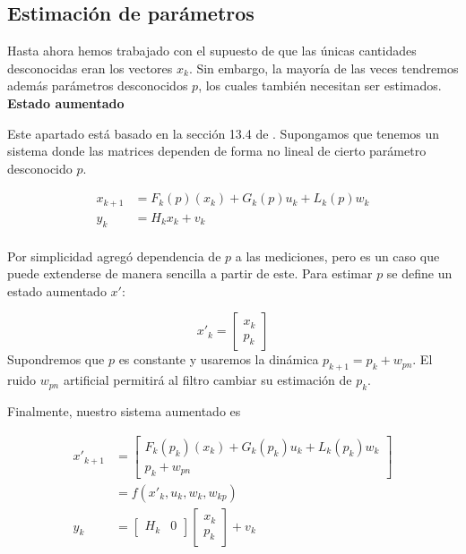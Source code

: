 \subsection{Estimación de
parámetros}\label{estimacion-de-parametros}

Hasta ahora hemos trabajado con el supuesto de que las únicas cantidades desconocidas eran los vectores \(x_k\). Sin embargo, la mayoría de las veces tendremos además parámetros desconocidos \(p\), los cuales también necesitan ser estimados. \\

\noindent\textbf{Estado aumentado}

Este apartado está basado en la sección 13.4 de \cite{Simon2006}. Supongamos que tenemos un sistema donde las matrices dependen de forma no lineal de cierto parámetro desconocido \(p\). 

\[
\begin{aligned}
x_{k+1} &= F_k(p)(x_k) + G_k(p)u_k + L_k(p)w_k \\
y_{k} &= H_k x_k + v_k \\ 
\end{aligned}
\]

Por simplicidad agregó dependencia de \(p\) a las mediciones, pero es un caso que puede extenderse de manera sencilla a partir de este. Para estimar \(p\) se define un estado aumentado \(x'\):

\[
x'_k = \begin{bmatrix}x_k \\ p_k \end{bmatrix}
\]
Supondremos que \(p\) es constante y usaremos la dinámica \(p_{k+1} = p_k + w_{pn}\). El ruido \(w_{pn}\) artificial permitirá al filtro cambiar su estimación de \(p_k\). 

Finalmente, nuestro sistema aumentado es 

\[
\begin{aligned}
x'_{k+1} &= \begin{bmatrix} F_k(p_k)(x_k) + G_k(p_k)u_k + L_k(p_k)w_k \\ p_k + w_{pn} \end{bmatrix} \\
&= f(x'_{k}, u_k, w_k, w_{kp}) \\
y_{k} &= \begin{bmatrix} H_k & 0 \end{bmatrix} \begin{bmatrix}x_k \\ p_k \end{bmatrix} + v_k \\ 
\end{aligned}
\]

